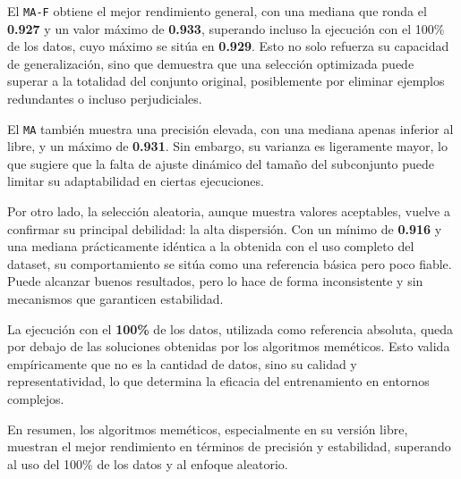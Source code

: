 El \texttt{MA-F} obtiene el mejor rendimiento general, con una mediana que ronda el \textbf{0.927} y un valor máximo de \textbf{0.933},
superando incluso la ejecución con el 100\% de los datos, cuyo máximo se sitúa en \textbf{0.929}.
Esto no solo refuerza su capacidad de generalización, sino que demuestra que una selección optimizada puede superar a la totalidad del conjunto original,
posiblemente por eliminar ejemplos redundantes o incluso perjudiciales.

El \texttt{MA} también muestra una precisión elevada, con una mediana apenas inferior al libre, y un máximo de \textbf{0.931}.
Sin embargo, su varianza es ligeramente mayor, lo que sugiere que la falta de ajuste dinámico del tamaño del subconjunto puede limitar su adaptabilidad en ciertas ejecuciones.

Por otro lado, la selección aleatoria, aunque muestra valores aceptables, vuelve a confirmar su principal debilidad: la alta dispersión.
Con un mínimo de \textbf{0.916} y una mediana prácticamente idéntica a la obtenida con el uso completo del dataset,
su comportamiento se sitúa como una referencia básica pero poco fiable.
Puede alcanzar buenos resultados, pero lo hace de forma inconsistente y sin mecanismos que garanticen estabilidad.

La ejecución con el \textbf{100\%} de los datos, utilizada como referencia absoluta, queda por debajo de las soluciones obtenidas por los algoritmos meméticos.
Esto valida empíricamente que no es la cantidad de datos, sino su calidad y representatividad, lo que determina la eficacia del entrenamiento en entornos complejos.

En resumen, los algoritmos meméticos, especialmente en su versión libre, muestran el mejor rendimiento en términos de precisión y estabilidad,
superando al uso del 100\% de los datos y al enfoque aleatorio.

